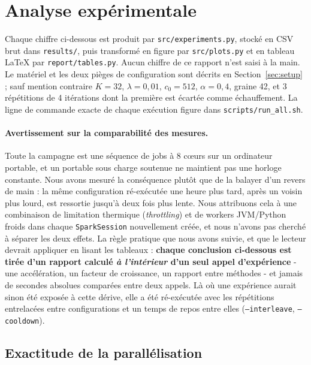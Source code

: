 
\section{Analyse expérimentale}\label{sec:exp}

Chaque chiffre ci-dessous est produit par \texttt{src/experiments.py}, stocké en CSV
brut dans \texttt{results/}, puis transformé en figure par \texttt{src/plots.py} et en
tableau LaTeX par \texttt{report/tables.py}. Aucun chiffre de ce rapport n'est saisi à
la main. Le matériel et les deux pièges de configuration sont décrits en
Section~\ref{sec:setup} ; sauf mention contraire $K=32$, $\lambda=0,01$, $c_0=512$,
$\alpha=0,4$, graine 42, et 3 répétitions de 4 itérations dont la première est
écartée comme échauffement. La ligne de commande exacte de chaque exécution figure
dans \texttt{scripts/run\_all.sh}.

\paragraph{Avertissement sur la comparabilité des mesures.} Toute la campagne est une
séquence de jobs à 8 cœurs sur un ordinateur portable, et un portable
sous charge soutenue ne maintient pas une horloge constante. Nous avons mesuré la
conséquence plutôt que de la balayer d'un revers de main : la même configuration
ré-exécutée une heure plus tard, après un voisin plus lourd, est ressortie jusqu'à
deux fois plus lente. Nous attribuons cela à une combinaison de limitation thermique
(\emph{throttling}) et de workers JVM/Python froids dans chaque \texttt{SparkSession}
nouvellement créée, et nous n'avons pas cherché à séparer les deux effets. La règle
pratique que nous avons suivie, et que le lecteur devrait appliquer en lisant les
tableaux : \textbf{chaque conclusion ci-dessous est tirée d'un rapport calculé
\emph{à l'intérieur} d'un seul appel d'expérience} - une accélération, un facteur de
croissance, un rapport entre méthodes - et jamais de secondes absolues comparées
entre deux appels. Là où une expérience aurait sinon été exposée à cette dérive, elle
a été ré-exécutée avec les répétitions entrelacées entre configurations et un temps de
repos entre elles (\texttt{--interleave}, \texttt{--cooldown}).

\subsection{Exactitude de la parallélisation}\label{sec:correctness}

